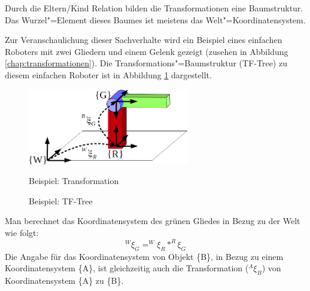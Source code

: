 Durch die Eltern/Kind Relation bilden die Transformationen eine Baumstruktur.
Das Wurzel"=Element dieses Baumes ist meistens das Welt"=Koordinatensystem.


Zur Veranschaulichung dieser Sachverhalte wird ein Beispiel eines einfachen Roboters mit zwei Gliedern und einem Gelenk gezeigt (zusehen in Abbildung \ref{chap:transformationen}).
Die Transformations"=Baumstruktur (TF-Tree) zu diesem einfachen Roboter ist in Abbildung \ref{Ab:tf-tree} dargestellt.

\begin{figure}[ht!]
\begin{minipage}{0.5\textwidth}
	\centering
	\includegraphics[width=7cm]{images/Transformation.png}
	\caption{Beispiel: Transformation}
	\label{Ab:transformation}
\end{minipage}
\begin{minipage}{0.48\textwidth}
\centering
{}
	\caption{Beispiel: TF-Tree}
	\label{Ab:tf-tree}

\end{minipage}
\end{figure}

Man berechnet das Koordinatensystem des grünen Gliedes in Bezug zu der Welt wie folgt:
\begin{equation}
^{W}\xi_{G} = ^{W}\xi_{R} * ^{R}\xi_{G}
\end{equation}
Die Angabe für das Koordinatensystem von Objekt \{B\}, in Bezug zu einem Koordinatensystem \{A\}, ist gleichzeitig auch die Transformation ($^{A}\xi_{B}$) von Koordinatensystem \{A\} zu \{B\}.

